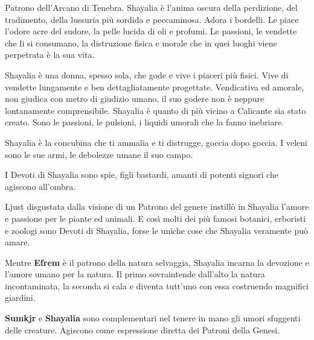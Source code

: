 \begin{multicols}{2}
Patrono dell'Arcano di Tenebra. Shayalia è l'anima oscura della perdizione, del tradimento, della lussuria più sordida e peccaminosa. Adora i bordelli. Le piace l'odore acre del sudore, la pelle lucida di oli e profumi. Le passioni, le vendette che li si consumano, la distruzione fisica e morale che in quei luoghi viene perpetrata è la sua vita.

Shayalia è una donna, spesso sola, che gode e vive i piaceri più fisici. Vive di vendette lungamente e ben dettagliatamente progettate. Vendicativa ed amorale, non giudica con metro di giudizio umano, il suo godere non è neppure lontanamente comprensibile. Shayalia è quanto di più vicino a Calicante sia stato creato. Sono le passioni, le pulsioni, i liquidi umorali che la fanno inebriare.

Shayalia è la concubina che ti ammalia e ti distrugge, goccia dopo goccia. I veleni sono le sue armi, le debolezze umane il suo campo.

I Devoti di Shayalia sono spie, figli bastardi, amanti di potenti signori che agiscono all'ombra.

Ljust disgustata dalla visione di un Patrono del genere instillò in Shayalia l'amore e passione per le piante ed animali. E così molti dei più famosi botanici, erboristi e zoologi sono Devoti di Shayalia, forse le uniche cose che Shayalia veramente può amare.

\medskip

\begin{changemargin}{0.3cm}{0.3cm}\begin{narratore}
Mentre \textbf{Efrem} è il patrono della natura selvaggia, Shayalia incarna la devozione e l'amore umano per la natura. Il primo sovraintende dall'alto la natura incontaminata, la seconda si cala e diventa tutt'uno con essa costruendo magnifici giardini.

\medskip

\textbf{Sumkjr} e \textbf{Shayalia} sono complementari nel tenere in mano gli umori sfuggenti delle creature. Agiscono come espressione diretta dei Patroni della Genesi.

\end{narratore}\end{changemargin}

\medskip


\end{multicols}
